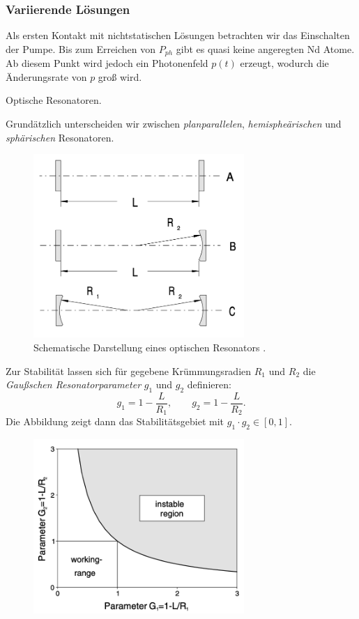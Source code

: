 \documentclass{subfiles}
\begin{document}
\begin{Antwort}
        \subsubsection*{Variierende Lösungen}
            Als ersten Kontakt mit nichtstatischen Lösungen betrachten wir das Einschalten der Pumpe. Bis zum Erreichen von $P_{ph}$ gibt es quasi keine angeregten Nd Atome. Ab diesem Punkt wird jedoch ein Photonenfeld $p(t)$ erzeugt, wodurch die Änderungsrate von $p$ groß wird. 

    \end{Antwort}

    \begin{Frage}
        Optische Resonatoren.
    \end{Frage}
    \begin{Antwort}
        Grundätzlich unterscheiden wir zwischen \emph{planparallelen}, \emph{hemispheärischen} und \emph{sphärischen} Resonatoren.
        \begin{figure}[H]
            \centering
            \includegraphics[width=8cm]{Bilddateien/ResonatorBasic.png}
            \caption{Schematische Darstellung eines optischen Resonators \cite{exp8-paper}.}
            \label{fig:OptischerResonator}
        \end{figure}
        Zur Stabilität lassen sich für gegebene Krümmungsradien $R_1$ und $R_2$ die \emph{Gaußschen Resonatorparameter} $g_1$ und $g_2$ definieren:
        \[
            g_1 = 1 - \frac{L}{R_1}, \qquad g_2 = 1 - \frac{L}{R_2}.
        \]
        Die Abbildung zeigt dann das Stabilitätsgebiet mit $g_1\cdot g_2\in [0,1]$.
        \begin{figure}[H]
            \centering
            \includegraphics[width=8cm]{Bilddateien/StabileGebiete.png}

\end{figure}
\end{Antwort}
\end{document}
